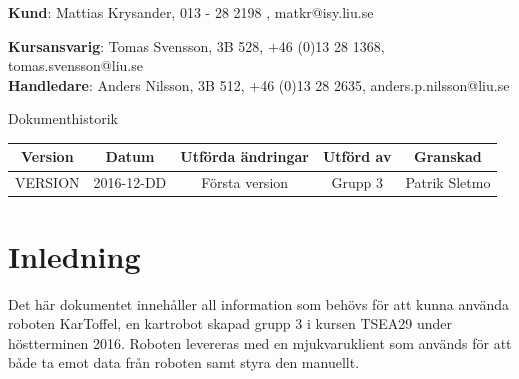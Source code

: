 \documentclass{article}
\begin{document}
\begin{center}
\textbf{Kund}: Mattias Krysander, 013 - 28 2198 , matkr@isy.liu.se
\end{center}

\begin{center}
\textbf{Kursansvarig}: Tomas Svensson, 3B 528, +46 (0)13 28 1368, tomas.svensson@liu.se \\
\textbf{Handledare}: Anders Nilsson, 3B 512, +46 (0)13 28 2635, anders.p.nilsson@liu.se
\end{center}
\vspace*{\fill}
\clearpage

\renewcommand*\contentsname{Innehållsförteckning}
\tableofcontents
\clearpage


{
\sffamily
\centering
\large


{\huge 
Dokumenthistorik \\
}
\begin{table}[H]
\centering
\begin{tabular}{ | c | c | c | c | c |} 
\hline
\textbf{Version} & \textbf{Datum} & \textbf{Utförda ändringar} & \textbf{Utförd av } & \textbf{Granskad} \\
\hline
VERSION & 2016-12-DD & Första version & Grupp 3 & Patrik Sletmo \\
\hline

\end{tabular}
\end{table}
}

\clearpage
\section{Inledning}
Det här dokumentet innehåller all information som behövs för att kunna använda roboten KarToffel, en kartrobot skapad grupp 3 i kursen TSEA29 under höstterminen 2016. Roboten levereras med en mjukvaruklient som används för att både ta emot data från roboten samt styra den manuellt. 


\clearpage
\end{document}
